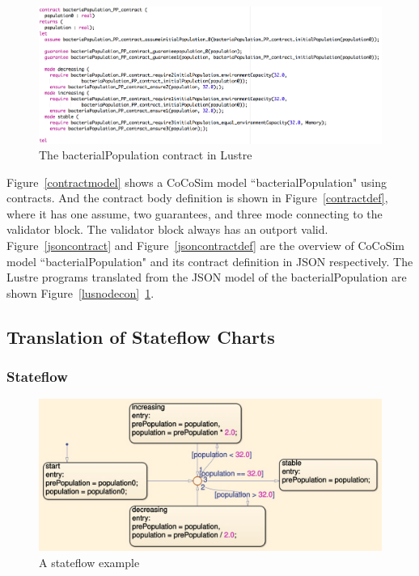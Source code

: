 \documentclass{article}
\begin{document}
\begin{figure}[h]
\begin{center}
  \includegraphics[scale=0.3]{figures/luscon}    
\end{center}  
  \caption{The bacterialPopulation contract in Lustre}
  \label{luscon}
\end{figure}

Figure~\ref{contractmodel} shows a CoCoSim model ``bacterialPopulation" using contracts. 
And the contract body definition is shown in Figure~\ref{contractdef}, where it has one \textsf{assume}, two \textsf{guarantees}, and three \textsf{mode} connecting to the \textsf{validator} block. 
The \textsf{validator} block always has an outport \textsf{valid}. 
Figure~\ref{jsoncontract} and Figure~\ref{jsoncontractdef} are the overview of CoCoSim model \textsf{``bacterialPopulation"} and its contract definition in JSON respectively. 
The Lustre programs translated from the JSON model of the bacterialPopulation are shown Figure~\ref{lusnodecon}~\ref{luscon}.

\subsection{Translation of Stateflow Charts}

\subsubsection{Stateflow}
\begin{figure}[h]
\begin{center}
  \includegraphics[scale=0.2]{figures/sf}    
\end{center}  
  \caption{A stateflow example}
  \label{sf}
\end{figure}
\end{document}
